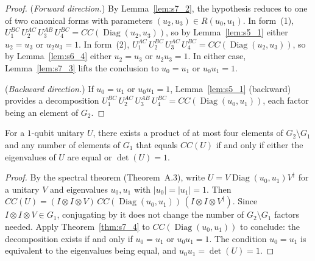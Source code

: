 \begin{proof}
  \leanok
  (\emph{Forward direction.})
  By Lemma~\ref{lem:s7_2}, the hypothesis reduces to one of two
  canonical forms with parameters $(u_2, u_3) \in R(u_0, u_1)$.
  In form~(1), $U_1^{BC}\, U_2^{AC}\, U_3^{AB}\, U_4^{BC}
    = CC(\operatorname{Diag}(u_2, u_3))$,
  so by Lemma~\ref{lem:s5_1} either $u_2 = u_3$ or $u_2 u_3 = 1$.
  In form~(2), $U_1^{AC}\, U_2^{BC}\, U_3^{AC}\, U_4^{BC}
    = CC(\operatorname{Diag}(u_2, u_3))$,
  so by Lemma~\ref{lem:s6_4} either $u_2 = u_3$ or $u_2 u_3 = 1$.
  In either case, Lemma~\ref{lem:s7_3} lifts the conclusion to
  $u_0 = u_1$ or $u_0 u_1 = 1$.

  (\emph{Backward direction.})
  If $u_0 = u_1$ or $u_0 u_1 = 1$, Lemma~\ref{lem:s5_1} (backward)
  provides a decomposition
  $U_1^{BC}\, U_2^{AC}\, U_3^{AB}\, U_4^{BC}
    = CC(\operatorname{Diag}(u_0, u_1))$,
  each factor being an element of $G_2$.
\end{proof}

\begin{corollary}
  \label{cor:s7_5}
  \leanok
  For a $1$-qubit unitary $U$, there exists a product of
  at most four elements of $G_2 \setminus G_1$ and any number
  of elements of $G_1$ that equals $CC(U)$ if and only if
  either the eigenvalues of $U$ are equal or $\det(U) = 1$.
\end{corollary}

\begin{proof}
  \leanok
  By the spectral theorem (Theorem~A.3), write
  $U = V \operatorname{Diag}(u_0, u_1) V^\dagger$
  for a unitary $V$ and eigenvalues $u_0, u_1$ with $|u_0| = |u_1| = 1$.
  Then $CC(U) = (I \otimes I \otimes V)\,
    CC(\operatorname{Diag}(u_0, u_1))\,
    (I \otimes I \otimes V^\dagger)$.
  Since $I \otimes I \otimes V \in G_1$, conjugating by it
  does not change the number of $G_2 \setminus G_1$ factors needed.
  Apply Theorem~\ref{thm:s7_4} to $CC(\operatorname{Diag}(u_0, u_1))$
  to conclude: the decomposition exists if and only if
  $u_0 = u_1$ or $u_0 u_1 = 1$.
  The condition $u_0 = u_1$ is equivalent to the eigenvalues being
  equal, and $u_0 u_1 = \det(U) = 1$.
\end{proof}